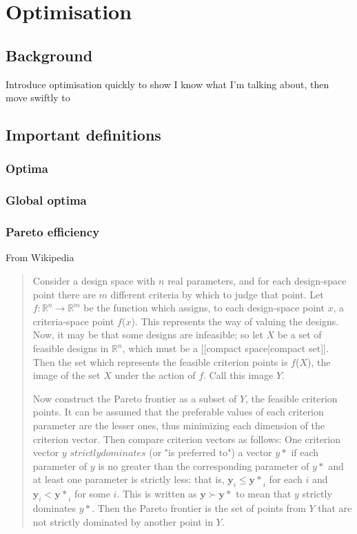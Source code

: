 \chapter{Optimisation}

\section{Background}
Introduce optimisation quickly to show I know what I'm talking about, then move swiftly to 

\section{Important definitions}

\subsection{Optima}
\subsection{Global optima}
\subsection{Pareto efficiency}

From Wikipedia
\begin{quote}
Consider a design space with $n$ real parameters, and for each design-space point there are $m$ different criteria by which to judge that point. Let $f : \mathbb{R}^n \rightarrow \mathbb{R}^m$ be the function which assigns, to each design-space point $x$, a criteria-space point $f$($x$). This represents the way of valuing the designs. Now, it may be that some designs are infeasible; so let $X$ be a set of feasible designs in ${\mathbb{R}}^n$, which must be a [[compact space|compact set]]. Then the set which represents the feasible criterion points is $f$($X$), the image of the set $X$ under the action of $f$. Call this image $Y$.

Now construct the Pareto frontier as a subset of $Y$, the feasible criterion points. It can be assumed that the preferable values of each criterion parameter are the lesser ones, thus minimizing each dimension of the criterion vector. Then compare criterion vectors as follows: One criterion vector $y$ $strictly dominates$ (or "is preferred to") a vector $y*$ if each parameter of $y$ is no greater than the corresponding parameter of $y*$ and at least one parameter is strictly less: that is, $\mathbf{y}_i \le \mathbf{y*}_i$ for each $i$ and $\mathbf{y}_i < \mathbf{y*}_i$ for some $i$. This is  written as $\mathbf{y} \succ \mathbf{y*}$ to mean that $y$ strictly dominates $y*$. Then the Pareto frontier is the set of points from $Y$ that are not strictly dominated by another point in $Y$.
\end{quote}

